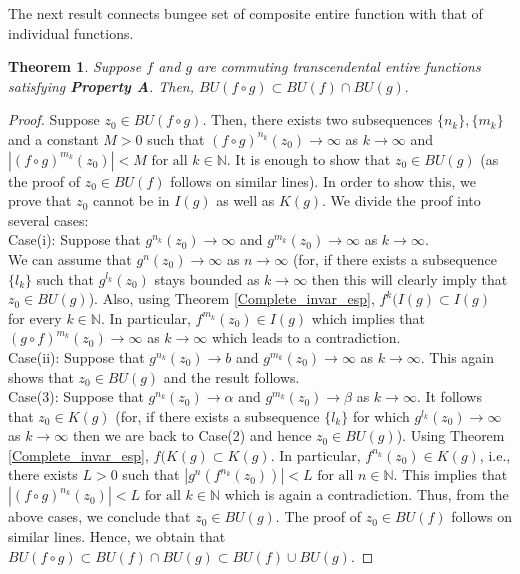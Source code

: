\documentclass[a4paper,12pt]{amsart}
\numberwithin{equation}{section}
\newtheorem{theorem}{Theorem}[section]
\begin{document}
The next result connects bungee set of composite entire function with that of individual functions.
\begin{theorem}
Suppose $f$ and $g$ are commuting transcendental entire functions  satisfying \textbf{Property A}. Then, $BU(f \circ g)\subset BU(f)\cap BU(g).$
\end{theorem}

\begin{proof}


 Suppose $z_0\in BU(f\circ g).$ Then,  there exists two subsequences $\{n_k\},\{m_k\}$ and a constant $M>0$ such that $(f\circ g)^{n_k}(z_0)\to\infty$ as $k\to\infty$ and $|(f\circ g)^{m_k}(z_0)|<M \mbox{ for all } k\in \mathbb{N}$. It is enough to show that $z_0\in BU(g)$ (as the proof of $z_0\in BU(f)$ follows on similar lines). In order to show  this, we prove that $z_0$ cannot be in $I(g)$ as well as $K(g).$ We divide the proof into several cases:\\
Case(i): Suppose that $g^{n_k}(z_0)\to\infty$ and $g^{m_k}(z_0)\to\infty$ as $k\to\infty$.\\
We can assume that $g^n(z_0)\to\infty$ as $n\to\infty$
(for, if there exists a subsequence $\{l_k\}$ such 
that $g^{l_k}(z_0)$ stays bounded as $k\to\infty$ then 
this will clearly imply that $z_0\in BU(g)$). Also, using Theorem \ref{Complete_invar_esp}, $f^k(I(g)\subset I(g)$ for every  $k\in\mathbb{N}$. In particular, $f^{m_k}(z_0)\in I(g)$ which implies that $(g\circ f)^{m_k}(z_0)\to\infty $ as $k\to\infty$ which leads to a  contradiction. \\
Case(ii): Suppose that $g^{n_k}(z_0)\to b$ and $g^{m_k}(z_0)\to\infty$ as $k\to\infty$. This again shows that $z_0\in BU(g)$ and the result follows.\\
Case(3): Suppose that $g^{n_k}(z_0)\to \alpha $ and $g^{m_k}(z_0)\to \beta$ as $k\to\infty.$   It follows that $z_0\in K(g)$ (for,  if there exists a subsequence $\{l_k\}$ for 
which $g^{l_k}(z_0)\to\infty$ as $k\to\infty$ then we are back to Case(2) 
 and hence $z_0\in BU(g)$). Using Theorem \ref{Complete_invar_esp},  $f(K(g)\subset K(g)$. In particular, $f^{n_k}(z_0)\in K(g)$, i.e., there exists $L>0$ such that $|g^n(f^{n_k}(z_0))|<L \mbox{ for all } n\in\mathbb{N}$. This implies that $|(f\circ g)^{n_k}(z_0)|<L \mbox{ for all } k\in\mathbb{N}$ which is again a contradiction. Thus, from the above cases, we conclude that $z_0\in BU(g).$  The proof of $z_0\in BU(f)$ follows on similar lines. 
Hence, we obtain that $BU(f\circ g)\subset BU(f)\cap BU(g)\subset BU(f)\cup BU(g)$.
\end{proof}
\end{document}
